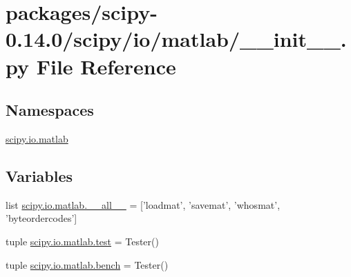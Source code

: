 \hypertarget{packages_2scipy-0_814_80_2scipy_2io_2matlab_2____init_____8py}{}\section{packages/scipy-\/0.14.0/scipy/io/matlab/\+\_\+\+\_\+init\+\_\+\+\_\+.py File Reference}
\label{packages_2scipy-0_814_80_2scipy_2io_2matlab_2____init_____8py}
\subsection*{Namespaces}
\begin{DoxyCompactItemize}
\item 
 \hyperlink{namespacescipy_1_1io_1_1matlab}{scipy.\+io.\+matlab}
\end{DoxyCompactItemize}
\subsection*{Variables}
\begin{DoxyCompactItemize}
\item 
list \hyperlink{namespacescipy_1_1io_1_1matlab_ac81ea00218fe5b848367eaef0aa2b159}{scipy.\+io.\+matlab.\+\_\+\+\_\+all\+\_\+\+\_\+} = \mbox{[}'loadmat', 'savemat', 'whosmat', 'byteordercodes'\mbox{]}
\item 
tuple \hyperlink{namespacescipy_1_1io_1_1matlab_a8a23168bc23df308726c9f0ee10b3a28}{scipy.\+io.\+matlab.\+test} = Tester()
\item 
tuple \hyperlink{namespacescipy_1_1io_1_1matlab_a82afe4cace6a0b53fab5265a997b1e20}{scipy.\+io.\+matlab.\+bench} = Tester()
\end{DoxyCompactItemize}

